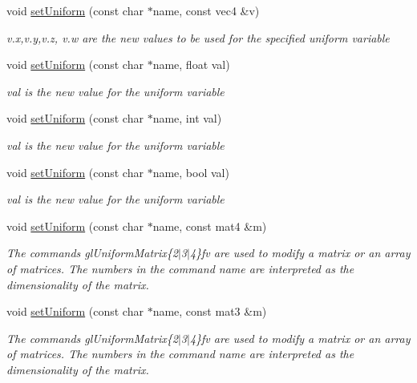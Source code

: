 \begin{DoxyCompactItemize}
void \hyperlink{class_g_l_s_l_program_aadf3691c119baac516735b0d01b85f7e}{set\+Uniform} (const char $\ast$name, const vec4 \&v)
\begin{DoxyCompactList}\small\item\em v.\+x,v.\+y,v.\+z, v.\+w are the new values to be used for the specified uniform variable \end{DoxyCompactList}\item 
void \hyperlink{class_g_l_s_l_program_aae087de52f91a47ac23c9f6ebf369bc3}{set\+Uniform} (const char $\ast$name, float val)
\begin{DoxyCompactList}\small\item\em val is the new value for the uniform variable \end{DoxyCompactList}\item 
void \hyperlink{class_g_l_s_l_program_a437782e359f10918044f1bbad0a98148}{set\+Uniform} (const char $\ast$name, int val)
\begin{DoxyCompactList}\small\item\em val is the new value for the uniform variable \end{DoxyCompactList}\item 
void \hyperlink{class_g_l_s_l_program_acfab16fafb4617f0625f170b39716eb8}{set\+Uniform} (const char $\ast$name, bool val)
\begin{DoxyCompactList}\small\item\em val is the new value for the uniform variable \end{DoxyCompactList}\item 
void \hyperlink{class_g_l_s_l_program_a44a7ace14e6c82311526e47264957fa9}{set\+Uniform} (const char $\ast$name, const mat4 \&m)
\begin{DoxyCompactList}\small\item\em The commands gl\+Uniform\+Matrix\{2$\vert$3$\vert$4\}fv are used to modify a matrix or an array of matrices. The numbers in the command name are interpreted as the dimensionality of the matrix. \end{DoxyCompactList}\item 
void \hyperlink{class_g_l_s_l_program_a69bd967b17f6b06e9fd4772b25e86396}{set\+Uniform} (const char $\ast$name, const mat3 \&m)
\begin{DoxyCompactList}\small\item\em The commands gl\+Uniform\+Matrix\{2$\vert$3$\vert$4\}fv are used to modify a matrix or an array of matrices. The numbers in the command name are interpreted as the dimensionality of the matrix. \end{DoxyCompactList}\item 

\end{DoxyCompactItemize}
